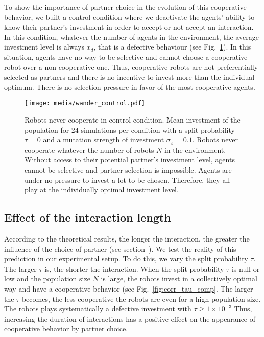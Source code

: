 \documentclass[letterpaper]{article}
\begin{document}
To show the importance of partner choice in the evolution of this cooperative behavior, %
we built a control condition where we deactivate the agents' ability to know their partner's investment in order to accept or not accept an interaction. %
In this condition, whatever the number of agents in the environment, the average investment level is always $x_d$, that is a defective behaviour (see Fig.~\ref{fig:control}). %
In this situation, agents have no way to be selective and cannot choose a cooperative robot over a non-cooperative one. Thus, cooperative robots are not preferentially selected as partners and there is no incentive to invest more than the individual optimum. There is no selection pressure in favor of the most cooperative agents. %

\begin{figure}[tbhp]
    \begin{center}
        \texttt{[image: media/wander\_control.pdf]}
        \vskip 0.25cm
        \caption{Robots never cooperate in control condition. Mean investment of the population for 24 simulations per condition with a split probability $\tau = 0$ and a mutation strength of investment $\sigma_x = 0.1$. Robots never cooperate whatever the number of robots $N$ in the environment. Without access to their potential partner's investment level, agents cannot be selective and partner selection is impossible. Agents are under no pressure to invest a lot to be chosen. Therefore, they all play at the individually optimal investment level.
        }
        \label{fig:control}
    \end{center}
\end{figure}


\subsection{Effect of the interaction length}


According to the theoretical results, the longer the interaction, the greater the influence of the choice of partner (see section~). We test the reality of this prediction in our experimental setup. %
To do this, we vary the split probability $\tau$.  %
The larger $\tau$ is, the shorter the interaction. When the split probability $\tau$ is null or low and the population size $N$ is large, the robots invest in a collectively optimal way and have a cooperative behavior (see Fig.~\ref{fig:corr_tau_comp}. %
The larger the $\tau$ becomes, the less cooperative the robots are even for a high population size. The robots plays systematically a defective investment with $\tau \geq 1\times 10^{-3}$ Thus, increasing the duration of interactions has a positive effect on the appearance of cooperative behavior by partner choice. %
\end{document}
